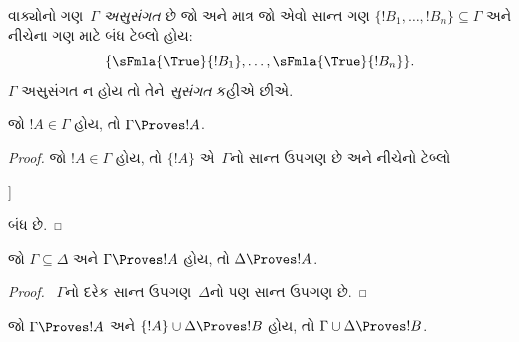 \begin{defn}[સુસંગતતા]
વાક્યોનો ગણ~$\Gamma$ \emph{અસુસંગત} છે જો અને માત્ર જો એવો સાન્ત
ગણ $\{!B_1, \dots, !B_n\} \subseteq \Gamma$ અને નીચેના ગણ માટે બંધ
ટેબ્લો હોય:
\[
\{
  \sFmla{\True}{!B_1}, \dots,
  \sFmla{\True}{!B_n}
  \}.
\]
$\Gamma$ અસુસંગત ન હોય તો તેને \emph{સુસંગત} કહીએ છીએ.
\end{defn}

\begin{prop}[સ્વવાચકતા]
જો $!A \in \Gamma$ હોય, તો $\Gamma \Proves !A$.
\end{prop}

\begin{proof}
જો $!A \in \Gamma$ હોય, તો $\{!A\}$ એ~$\Gamma$નો સાન્ત ઉપગણ છે અને
નીચેનો ટેબ્લો
\begin{oltableau}
  [\sFmla{\False}{\formula{A}}, just = \TAss
    [\sFmla{\True}{\formula{A}}, just = \TAss,close]
  ]
\end{oltableau}
બંધ છે.
\end{proof}


\begin{prop}
જો $\Gamma \subseteq \Delta$ અને $\Gamma \Proves !A$ હોય, તો
$\Delta \Proves !A$.
\end{prop}

\begin{proof}
~$\Gamma$નો દરેક સાન્ત ઉપગણ~$\Delta$નો પણ સાન્ત ઉપગણ છે.
\end{proof}

\begin{prop}[પરંપરિતતા]
જો $\Gamma \Proves !A$ અને $\{!A\} \cup \Delta \Proves !B$ હોય, તો
$\Gamma \cup \Delta \Proves !B$.
\end{prop}

